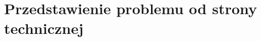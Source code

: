 \chapter{Przedstawienie problemu od strony technicznej}
\label{cha:przedstawienieProblemuOdStronyTechnicznej}